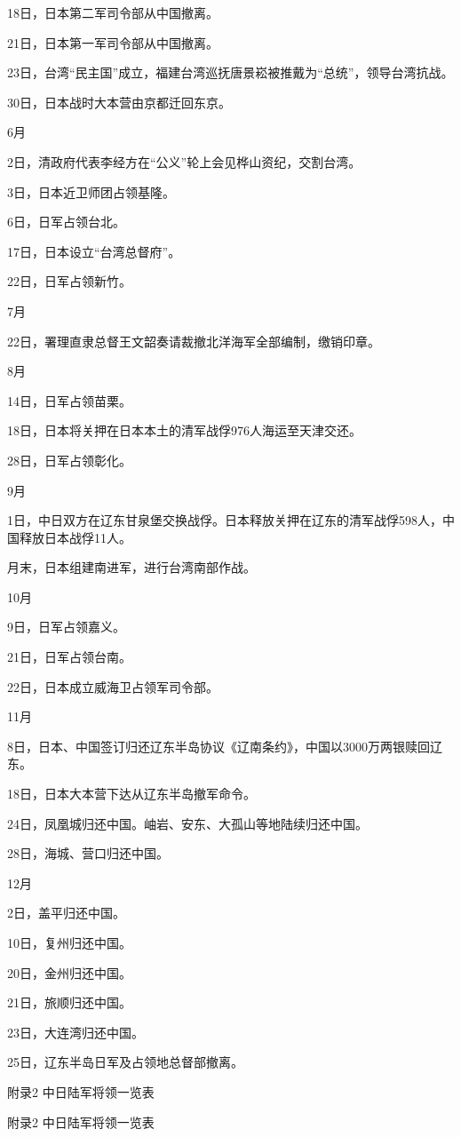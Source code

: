 \documentclass[12pt,UTF8]{ctexbook}
\begin{document}
18日，日本第二军司令部从中国撤离。

21日，日本第一军司令部从中国撤离。

23日，台湾“民主国”成立，福建台湾巡抚唐景崧被推戴为“总统”，领导台湾抗战。

30日，日本战时大本营由京都迁回东京。

6月

2日，清政府代表李经方在“公义”轮上会见桦山资纪，交割台湾。

3日，日本近卫师团占领基隆。

6日，日军占领台北。

17日，日本设立“台湾总督府”。

22日，日军占领新竹。

7月

22日，署理直隶总督王文韶奏请裁撤北洋海军全部编制，缴销印章。

8月

14日，日军占领苗栗。

18日，日本将关押在日本本土的清军战俘976人海运至天津交还。

28日，日军占领彰化。

9月

1日，中日双方在辽东甘泉堡交换战俘。日本释放关押在辽东的清军战俘598人，中国释放日本战俘11人。

月末，日本组建南进军，进行台湾南部作战。

10月

9日，日军占领嘉义。

21日，日军占领台南。

22日，日本成立威海卫占领军司令部。

11月

8日，日本、中国签订归还辽东半岛协议《辽南条约》，中国以3000万两银赎回辽东。

18日，日本大本营下达从辽东半岛撤军命令。

24日，凤凰城归还中国。岫岩、安东、大孤山等地陆续归还中国。

28日，海城、营口归还中国。

12月

2日，盖平归还中国。

10日，复州归还中国。

20日，金州归还中国。

21日，旅顺归还中国。

23日，大连湾归还中国。

25日，辽东半岛日军及占领地总督部撤离。

附录2 中日陆军将领一览表

附录2
中日陆军将领一览表
\end{document}
